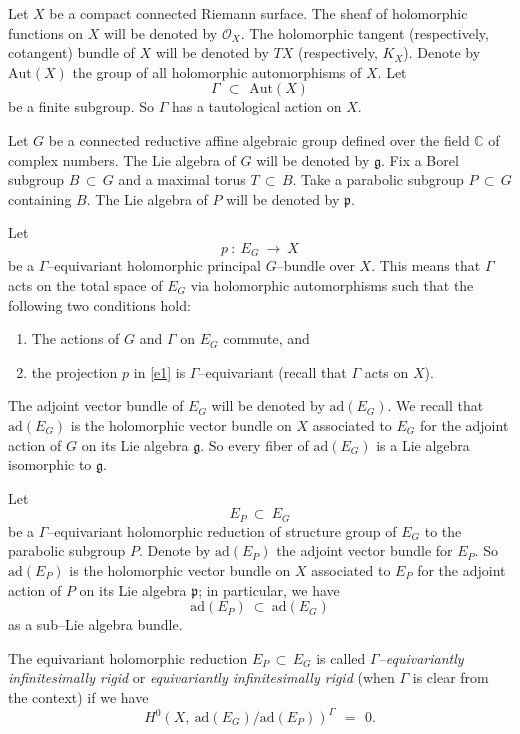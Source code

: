 \documentclass[12pt, reqno]{amsart}
\numberwithin{equation}{section}
\newcommand{\ad}{\textrm{ad}}
\newcommand{\Aut}{\textrm{Aut}}
\begin{document}
Let $X$ be a compact connected Riemann surface. The sheaf of holomorphic functions on $X$ will be denoted
by ${\mathcal O}_X$. The holomorphic
tangent (respectively, cotangent) bundle of $X$ will be denoted by $TX$ (respectively, $K_X$).
Denote by $\Aut(X)$ the group of all holomorphic automorphisms of $X$.
Let $$\Gamma\ \, \subset\ \, \text{Aut}(X)$$ be a finite subgroup. So $\Gamma$ has a tautological
action on $X$.

Let $G$ be a connected reductive affine algebraic group defined over the field $\mathbb C$ of complex numbers.
The Lie algebra of $G$ will be denoted by $\mathfrak g$.
Fix a Borel subgroup $B\, \subset\, G$ and a maximal torus $T\, \subset\, B$.
Take a parabolic subgroup $P\, \subset\, G$ containing $B$. The Lie algebra of $P$ will be denoted by
$\mathfrak p$.

Let
\begin{equation}\label{e1}
p\ :\ E_{G}\ \longrightarrow \ X
\end{equation}
be a $\Gamma$--equivariant holomorphic principal $G$--bundle
over $X$. This means that $\Gamma$ acts on the total space of $E_G$ via holomorphic automorphisms such that
the following two conditions hold:
\begin{enumerate}
\item The actions of $G$ and $\Gamma$ on $E_G$ commute, and

\item the projection $p$ in \eqref{e1} is $\Gamma$--equivariant (recall that $\Gamma$ acts on $X$).
\end{enumerate}
The adjoint vector bundle of $E_G$ will be denoted by $\text{ad}(E_G)$. We recall that $\text{ad}(E_G)$ is
the holomorphic vector bundle on $X$ associated to $E_G$ for the adjoint action of $G$ on its Lie
algebra $\mathfrak g$. So every fiber of $\text{ad}(E_G)$ is a Lie algebra isomorphic to $\mathfrak g$.

Let
\begin{equation}\label{ep}
E_P\ \subset\ E_G
\end{equation}
be a $\Gamma$--equivariant holomorphic reduction of structure group of $E_G$ to the parabolic subgroup $P$.
Denote by $\text{ad}(E_P)$ the adjoint vector bundle for $E_P$. So $\text{ad}(E_P)$ is
the holomorphic vector bundle on $X$ associated to $E_P$ for the adjoint action of $P$ on its Lie
algebra $\mathfrak p$; in particular, we have
$$
\text{ad}(E_P)\ \subset\ \text{ad}(E_G)
$$
as a sub--Lie algebra bundle.

The equivariant holomorphic reduction $E_{P}\,\subset \,E_{G}$ is called {\it $\Gamma$--equivariantly
infinitesimally rigid} or {\it equivariantly infinitesimally rigid} (when $\Gamma$ is clear from the context)
if we have
\begin{equation}\label{er}
H^{0}(X,\ \ad(E_{G})/\ad(E_{P}))^{\Gamma}\,\ =\,\ 0.
\end{equation}
\end{document}
